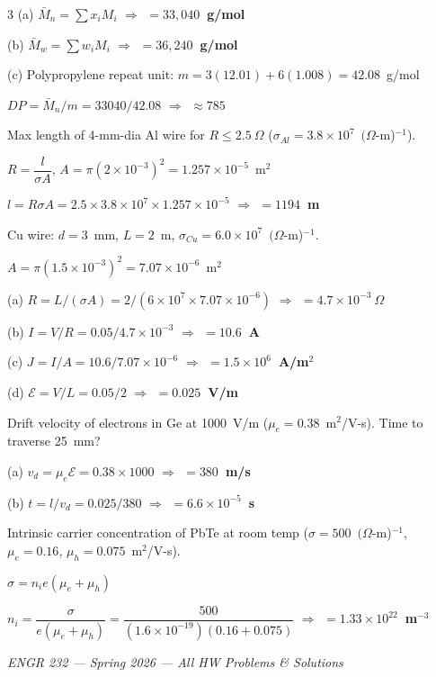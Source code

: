 \documentclass[8pt,letterpaper]{extarticle}
\newcommand{\prob}[1]{\smallskip\noindent{\footnotesize\bfseries\color{black!80} #1\quad}}
\newcommand{\soln}{\noindent{\footnotesize\itshape\color{blue!50!black}Sol: }}
\newcommand{\ans}[1]{{\footnotesize\bfseries\color{green!40!black}$\Rightarrow$ #1}}
\begin{document}
\begin{multicols*}{3}
(a) $\bar{M}_n = \sum x_i M_i$ \ans{$= 33{,}040$~g/mol}

(b) $\bar{M}_w = \sum w_i M_i$ \ans{$= 36{,}240$~g/mol}

(c) Polypropylene repeat unit: $m = 3(12.01)+6(1.008)=42.08$~g/mol

$DP = \bar{M}_n/m = 33040/42.08$ \ans{$\approx785$}

\prob{18.3} Max length of 4-mm-dia Al wire for $R\leq2.5~\Omega$ ($\sigma_{Al}=3.8\times10^7$~$(\Omega$-m)$^{-1}$).

\soln $R=\dfrac{l}{\sigma A}$, $A=\pi(2\times10^{-3})^2=1.257\times10^{-5}$~m$^2$

$l = R\sigma A = 2.5\times3.8\times10^7\times1.257\times10^{-5}$ \ans{$= 1194$~m}

\prob{18.5} Cu wire: $d=3$~mm, $L=2$~m, $\sigma_{Cu}=6.0\times10^7$~$(\Omega$-m)$^{-1}$.

\soln $A=\pi(1.5\times10^{-3})^2=7.07\times10^{-6}$~m$^2$

(a) $R = L/(\sigma A) = 2/(6\times10^7\times7.07\times10^{-6})$ \ans{$=4.7\times10^{-3}~\Omega$}

(b) $I=V/R=0.05/4.7\times10^{-3}$ \ans{$=10.6$~A}

(c) $J=I/A=10.6/7.07\times10^{-6}$ \ans{$=1.5\times10^6$~A/m$^2$}

(d) $\mathcal{E}=V/L=0.05/2$ \ans{$=0.025$~V/m}

\prob{18.10} Drift velocity of electrons in Ge at 1000~V/m ($\mu_e=0.38$~m$^2$/V-s). Time to traverse 25~mm?

\soln (a) $v_d = \mu_e\mathcal{E} = 0.38\times1000$ \ans{$=380$~m/s}

(b) $t = l/v_d = 0.025/380$ \ans{$=6.6\times10^{-5}$~s}

\prob{18.21} Intrinsic carrier concentration of PbTe at room temp ($\sigma=500$~$(\Omega$-m)$^{-1}$, $\mu_e=0.16$, $\mu_h=0.075$~m$^2$/V-s).

\soln $\sigma = n_i e(\mu_e+\mu_h)$

$n_i = \dfrac{\sigma}{e(\mu_e+\mu_h)} = \dfrac{500}{(1.6\times10^{-19})(0.16+0.075)}$ \ans{$= 1.33\times10^{22}$~m$^{-3}$}

\vfill
\begin{center}
\footnotesize\textit{ENGR 232 — Spring 2026 — All HW Problems \& Solutions}
\end{center}

\end{multicols*}
\end{document}

